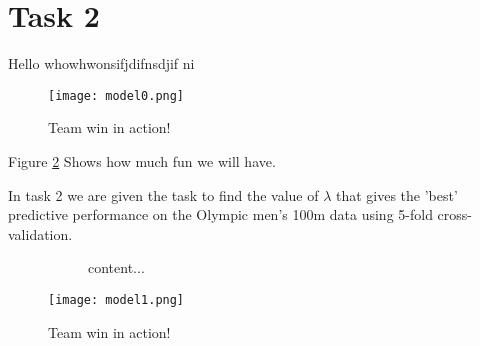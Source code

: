 \section{Task 2}
Hello whowhwonsifjdifnsdjif ni %

\begin{figure}[h] %
	\centering
	\texttt{[image: model0.png]} %
	\caption{Team win in action!}
	\label{teamWin} %
\end{figure}

Figure \ref{teamWin} Shows how much fun we will have.

In task 2 we are given the task to find the value of $\lambda$ that gives the 'best' predictive performance on the Olympic men's 100m data using 5-fold cross-validation.

\begin{figure}[h] %
	\centering
	\begin{subfigure}{.5\textwidth}
		content...
	\end{subfigure}
	\texttt{[image: model1.png]} %
	\caption{Team win in action!}
	\label{teamWin} %
\end{figure}

\lipsum[1-4]


